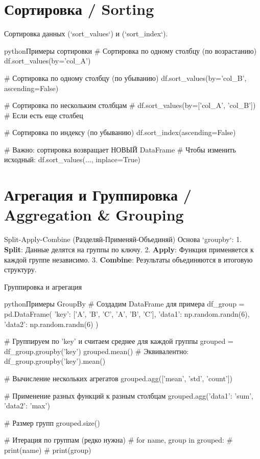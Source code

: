 \section{Сортировка / Sorting}
\begin{textbox}{Сортировка данных}
 (`sort\_values`) и  (`sort\_index`).

\begin{codebox}{python}{Примеры сортировки}
# Сортировка по одному столбцу (по возрастанию)
df.sort_values(by='col_A')

# Сортировка по одному столбцу (по убыванию)
df.sort_values(by='col_B', ascending=False)

# Сортировка по нескольким столбцам
# df.sort_values(by=['col_A', 'col_B']) # Если есть еще столбец

# Сортировка по индексу (по убыванию)
df.sort_index(ascending=False)

# Важно: сортировка возвращает НОВЫЙ DataFrame
# Чтобы изменить исходный: df.sort_values(..., inplace=True)
\end{codebox}
\end{textbox}

\section{Агрегация и Группировка / Aggregation \& Grouping}
\begin{myblock}{Split-Apply-Combine (Разделяй-Применяй-Объединяй)}
Основа `groupby`:
1.  \textbf{Split}: Данные делятся на группы по ключу.
2.  \textbf{Apply}: Функция применяется к каждой группе независимо.
3.  \textbf{Combine}: Результаты объединяются в итоговую структуру.
\end{myblock}

\begin{textbox}{Группировка и агрегация}
\begin{codebox}{python}{Примеры GroupBy}
# Создадим DataFrame для примера
df_group = pd.DataFrame({
    'key': ['A', 'B', 'C', 'A', 'B', 'C'],
    'data1': np.random.randn(6),
    'data2': np.random.randn(6)
})

# Группируем по 'key' и считаем среднее для каждой группы
grouped = df_group.groupby('key')
grouped.mean()
# Эквивалентно: df_group.groupby('key').mean()

# Вычисление нескольких агрегатов
grouped.agg(['mean', 'std', 'count'])

# Применение разных функций к разным столбцам
grouped.agg({'data1': 'sum', 'data2': 'max'})

# Размер групп
grouped.size()

# Итерация по группам (редко нужна)
# for name, group in grouped:
#     print(name)
#     print(group)
\end{codebox}
\end{textbox}

